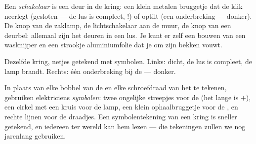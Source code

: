 \begin{example}[De schakelaar]\label{ex:g3:first-electric-circuit:switch}
Een \emph{schakelaar} is een deur in de kring: een
klein metalen bruggetje dat de klik neerlegt (gesloten --- de lus is
compleet, !) of optilt (een onderbreking --- donker). De knop van
de zaklamp, de lichtschakelaar aan de muur, de knop van een deurbel:
allemaal zijn het deuren in een lus. Je kunt er zelf een bouwen van
een wasknijper en een strookje aluminiumfolie dat je om zijn bekken
vouwt.
\end{example}

\begin{omfigure}

{\small Dezelfde kring, netjes getekend met symbolen. Links:
 dicht, de lus is compleet, de lamp brandt. Rechts: één
onderbreking bij de  --- donker.}
\end{omfigure}

\begin{remark}\label{rem:g3:first-electric-circuit:symbols}
In plaats van elke bobbel van de  en elke schroefdraad van het
 te tekenen, gebruiken elektriciens \emph{symbolen}: twee
ongelijke streepjes voor de  (het lange is $+$), een cirkel met
een kruis voor de lamp, een klein ophaalbruggetje voor de
, en rechte lijnen voor de draadjes. Een symbolentekening
van een kring is sneller getekend, en iedereen ter wereld kan hem
lezen --- die tekeningen zullen we nog jarenlang gebruiken.
\end{remark}

